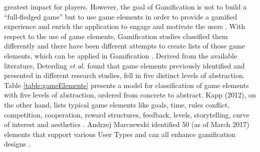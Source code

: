 greatest impact for players. However, the goal of Gamification is not to build a ``full-fledged game'' but to use game elements in order to provide a gamified experience and enrich the application to engage and motivate the users \cite{werbach2012win, deterding2011game}. With respect to the use of game elements, Gamification studies classified them differently and there have been different attempts to create lists of those game  elements,  which  can  be applied in Gamification \cite{werbach2012win, deterding2011game, kapp2012gamification, zichermann2011gamification}. Derived from the available literature, Deterding \textit{et al.} found that game elements previously identified and presented in different research studies, fell in five distinct levels of abstraction. Table \ref{table:gameElements} presents a model for classification of game elements with five levels of abstraction, ordered from concrete to abstract. Kapp (2012), on the other hand, lists  typical  game  elements  like  goals, time, rules  conflict,  competition,  cooperation, reward  structures,  feedback,  levels,  storytelling,  curve  of  interest  and  aesthetics \cite{kapp2012gamification}. Andrzej Marczewski identified 50 (as of March 2017) elements that support various User Types and can all enhance gamification designs \cite{50GamElements}.
